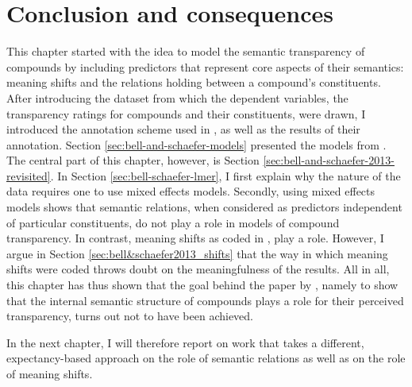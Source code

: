 \section{Conclusion and consequences }
\label{sec:con&con}

This chapter started with the idea to model the semantic transparency
of compounds by
including predictors that represent core aspects of their semantics: meaning shifts and the relations holding between a compound's
constituents.
After introducing the
dataset from which the dependent variables, the transparency ratings
for compounds and their constituents, were drawn, I introduced the
annotation scheme used in \citet{BellandSchaefer:2013}, as well as the
results of their annotation. Section
\ref{sec:bell-and-schaefer-models} presented the models from
\citet{BellandSchaefer:2013}. The central part of this chapter,
however, is Section \ref{sec:bell-and-schaefer-2013-revisited}. In
Section \ref{sec:bell-schaefer-lmer}, I first explain why the nature
of the data requires one to use mixed effects models. Secondly, using mixed effects models
shows that semantic relations, when considered as predictors
independent of particular constituents, do not play a role in models
of compound
transparency. In contrast, meaning shifts as coded in
\citet{BellandSchaefer:2013}, play a role. However, I argue in Section \ref{sec:bell&schaefer2013_shifts}
that the way in which meaning shifts were coded throws
doubt on the meaningfulness of the results. 
All in all, this chapter has thus shown that the goal behind
the paper by \citet{BellandSchaefer:2013}, namely to show that the internal semantic structure of compounds plays a role
for their perceived transparency, turns out not to have been achieved.

In the next chapter, I
will therefore report on work that takes a different, expectancy-based
approach on the role of semantic relations as well as on the role of
meaning shifts.

